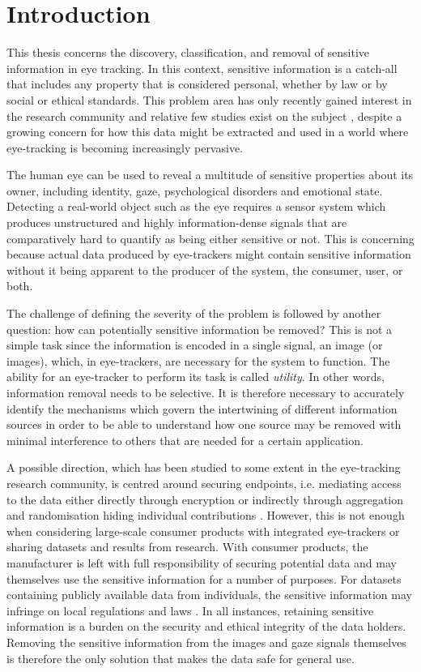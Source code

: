 \chapter{Introduction}
This thesis concerns the discovery, classification, and removal of sensitive information in eye tracking. In this context, sensitive information is a catch-all that includes any property that is considered personal, whether by law or by social or ethical standards. This problem area has only recently gained interest in the research community and relative few studies exist on the subject \parencite{BRENDAN_ARTICLE, BRENDAN_SNOW, differential-general, differential-general-two, privaceye}, despite a growing concern for how this data might be extracted and used in a world where eye-tracking is becoming increasingly pervasive. 

The human eye can be used to reveal a multitude of sensitive properties about its owner, including identity, gaze, psychological disorders and emotional state. Detecting a real-world object such as the eye requires a sensor system which produces unstructured and highly information-dense signals that are comparatively hard to quantify as being either sensitive or not. This is concerning because actual data produced by eye-trackers might contain sensitive information without it being apparent to the producer of the system, the consumer, user, or both.

The challenge of defining the severity of the problem is followed by another question: how can potentially sensitive information be removed? This is not a simple task since the information is encoded in a single signal, an image (or images), which, in eye-trackers, are necessary for the system to function. The ability for an eye-tracker to perform its task is called \emph{utility}. In other words, information removal needs to be selective. It is therefore necessary to accurately identify the mechanisms which govern the intertwining of different information sources in order to be able to understand how one source may be removed with minimal interference to others that are needed for a certain application.

A possible direction, which has been studied to some extent in the eye-tracking research community, is centred around securing endpoints, i.e. mediating access to the data either directly through encryption or indirectly through aggregation and randomisation hiding individual contributions \parencite{differential-general, differential-general-two}. However, this is not enough when considering large-scale consumer products with integrated eye-trackers or sharing datasets and results from research. With consumer products, the manufacturer is left with full responsibility of securing potential data and may themselves use the sensitive information for a number of purposes. For datasets containing publicly available data from individuals, the sensitive information may infringe on local regulations and laws \parencite{eu-gdpr}. In all instances, retaining sensitive information is a burden on the security and ethical integrity of the data holders. Removing the sensitive information from the images and gaze signals themselves is therefore the only solution that makes the data safe for general use.

